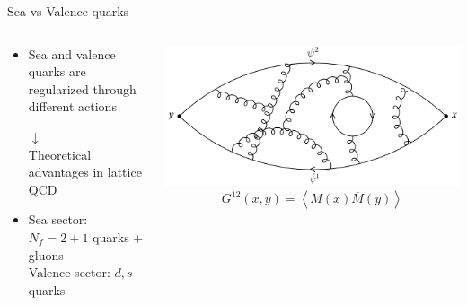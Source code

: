 \documentclass{beamer}
\newcommand{\la}{\langle}
\newcommand{\ra}{\rangle}
\begin{document}
\begin{frame}{Sea vs Valence quarks}
      \begin{columns}
            \begin{column}{0.5\textwidth}
                  \begin{itemize}
                        \item Sea and valence quarks are regularized through different actions
                        \begin{center}
                              $\downarrow$\\Theoretical advantages in lattice QCD
                        \end{center}
                        \item Sea sector: $N_f = 2+1$ quarks + gluons\\Valence sector: $d,s$ quarks
                  \end{itemize}
            \end{column}
            \begin{column}{0.45\textwidth}
                  \includegraphics[width=\textwidth]{assets/confinement_bis.png}
                  $$G^{12}(x,y) = \left\la M(x)\overline M(y) \right\ra$$
            \end{column}
      \end{columns}
\end{frame}
\end{document}
